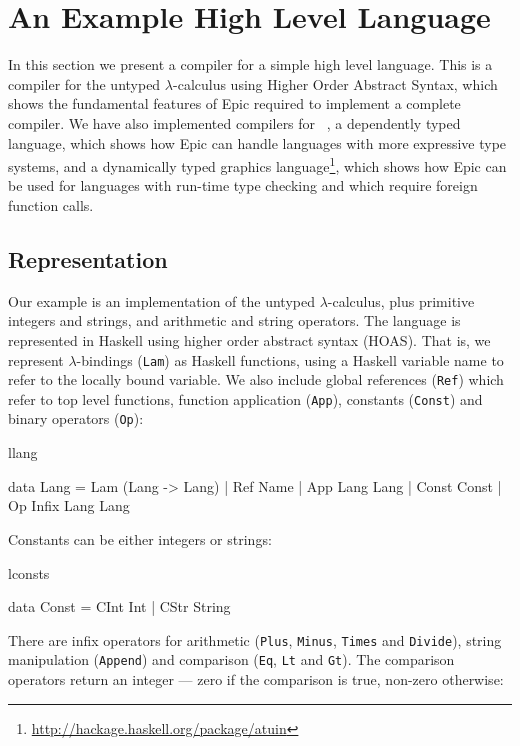 \section{An Example High Level Language}

In this section we present a compiler for a simple high level
language.
This is a compiler for the untyped $\lambda$-calculus using Higher Order
Abstract Syntax, which shows the fundamental features of Epic required
to implement a complete compiler. We have also implemented compilers
for \LamPi{}~\cite{simply-easy}, a dependently typed language, which
shows how Epic can handle languages with more expressive type systems,
and a dynamically typed graphics language\footnote{\url{http://hackage.haskell.org/package/atuin}}, which shows how Epic can be
used for languages with run-time type checking and which require
foreign function calls.

\subsection{Representation}

Our example is an implementation of the untyped
$\lambda$-calculus, plus primitive integers and strings, and
arithmetic and string operators. The language is represented in
Haskell using higher order abstract syntax (HOAS).  That is, we
represent $\lambda$-bindings (\texttt{Lam}) as Haskell functions,
using a Haskell variable name to refer to the locally bound
variable. We also include global references (\texttt{Ref}) which refer
to top level functions, function application (\texttt{App}), constants
(\texttt{Const}) and binary operators (\texttt{Op}):

\begin{SaveVerbatim}{llang}

data Lang = Lam (Lang -> Lang)
          | Ref Name
          | App Lang Lang
          | Const Const
          | Op Infix Lang Lang

\end{SaveVerbatim}

\noindent
Constants can be either integers or strings:

\begin{SaveVerbatim}{lconsts}

data Const = CInt Int | CStr String

\end{SaveVerbatim}

\noindent
There are infix operators for arithmetic (\texttt{Plus},
\texttt{Minus}, \texttt{Times} and \texttt{Divide}), string
manipulation (\texttt{Append}) and comparison (\texttt{Eq},
\texttt{Lt} and \texttt{Gt}). The comparison operators return an
integer --- zero if the comparison is true, non-zero otherwise:

